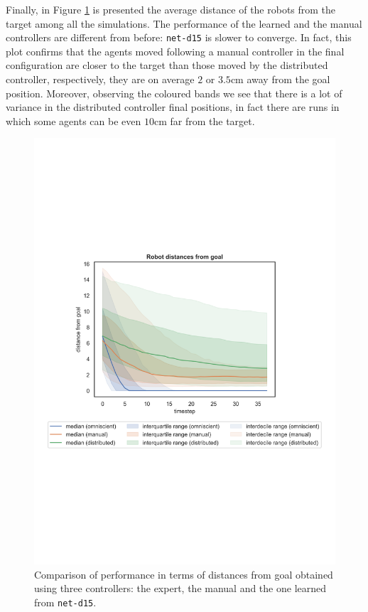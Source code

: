 \bigskip
Finally, in Figure \ref{fig:net-d15distance} is presented the average distance of 
the robots from the target among all the simulations. The performance of the 
learned and the manual controllers are different from before: \texttt{net-d15} is 
slower to converge. In fact, this plot 
confirms that the agents moved following a manual controller in the final 
configuration are closer to the target than those moved by the distributed 
controller, respectively, they are on average $2$ or $3.5$\gls{cm} away from the 
goal position. Moreover, observing the coloured bands we see that there is a lot of 
variance in the distributed controller final positions, in fact there are runs in which 
some agents can be even $10$\gls{cm} far from the target.
\begin{figure}[!htb]
	\centering
	\includegraphics[width=.65\textwidth]{contents/images/net-d15/distances-from-goal-compressed-distributed}%
	\caption[Evaluation of \texttt{net-d15} distances from goal.]{Comparison 
	of performance in terms of distances from goal obtained using three 
	controllers: the expert, the manual and the one learned from \texttt{net-d15}.}
	\label{fig:net-d15distance}
\end{figure}

